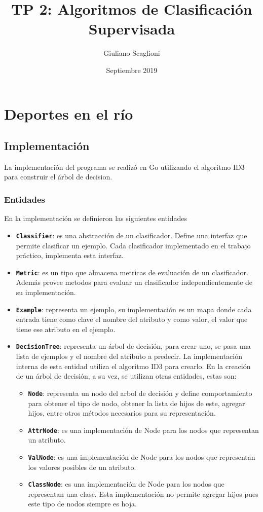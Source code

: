 \documentclass[a4paper]{article}
\title{TP 2: Algoritmos de Clasificación Supervisada}
\author{Giuliano Scaglioni}
\date{Septiembre 2019}
\newcommand{\bold}[1]{\textbf{\texttt{#1}}}
\begin{document}
\clearpage\maketitle
\thispagestyle{empty}

\newpage

\setcounter{page}{1}

\section{Deportes en el río}
  \subsection{Implementación}
  La implementación del programa se realizó en Go utilizando el algoritmo ID3 para construir el árbol de decision.

  \subsubsection{Entidades}
    En la implementación se definieron las siguientes entidades
    \begin{itemize}
      \item \bold{Classifier}: es una abstracción de un clasificador. Define una interfaz que permite clasificar un ejemplo. Cada clasificador implementado en el trabajo práctico, implementa esta interfaz.
      \item \bold{Metric}: es un tipo que almacena metricas de evaluación de un clasificador. Además provee metodos para evaluar un clasificador independientemente de su implementación.
      \item \bold{Example}: representa un ejemplo, su implementación es un mapa donde cada entrada tiene como clave el nombre del atributo y como valor, el valor que tiene ese atributo en el ejemplo.
      \item \bold{DecisionTree}: representa un árbol de decisión, para crear uno, se pasa una lista de ejemplos y el nombre del atributo a predecir. La implementación interna de esta entidad utiliza el algoritmo ID3 para crearlo. En la creación de un árbol de decisión, a su vez, se utilizan otras entidades, estas son:
      \begin{itemize}
        \item \bold{Node}: representa un nodo del arbol de decisión y define comportamiento para obtener el tipo de nodo, obtener la lista de hijos de este, agregar hijos, entre otros métodos necesarios para su representación.
        \item \bold{AttrNode}: es una implementación de Node para los nodos que representan un atributo.
        \item \bold{ValNode}: es una implementación de Node para los nodos que representan los valores posibles de un atributo.
        \item \bold{ClassNode}: es una implementación de Node para los nodos que representan una clase. Esta implementación no permite agregar hijos pues este tipo de nodos siempre es hoja.
      \end{itemize}
    \end{itemize}
\end{document}
